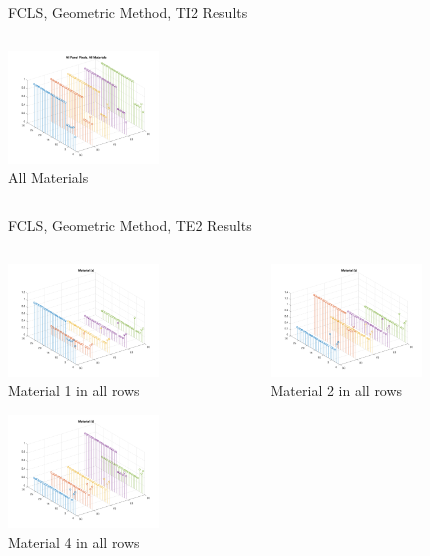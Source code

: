 \documentclass{beamer}
\begin{document}
\begin{frame}{FCLS, Geometric Method, TI2 Results}
\begin{columns}
\begin{column}{0.33\textwidth}
        \includegraphics[width=4cm,center]{gfcls_ti2_allmaterials}
        \\ All Materials
        \centering
    \end{column}
\end{columns}
\end{frame}

\begin{frame}{FCLS, Geometric Method, TE2 Results}
\begin{columns}
    \begin{column}{0.33\textwidth}
        \includegraphics[width=4cm,center]{gfcls_te2_material_stem_1}
        \\ Material 1 in all rows
        \centering

        \includegraphics[width=4cm,center]{gfcls_te2_material_stem_4}
        \\ Material 4 in all rows
        \centering
    \end{column}
    \begin{column}{0.33\textwidth}
        \includegraphics[width=4cm,center]{gfcls_te2_material_stem_2}
        \\ Material 2 in all rows
        \centering


\end{column}
\end{columns}
\end{frame}
\end{document}
